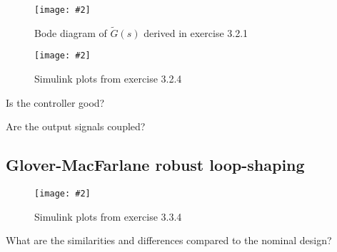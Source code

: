 \documentclass[a4paper,11pt]{article}
\newcommand{\image}[3][width=1.0\columnwidth]{
	\begin{figure}[h!]
		\centering
	    \texttt{[image: \#2]}
		\caption{#3}
		\label{fig:#2}
	\end{figure}
}
\begin{document}
	\image{figure_4.pdf}{Bode diagram of $\tilde{G}(s)$ derived in exercise 3.2.1}
	\image{figure_5.pdf}{Simulink plots from exercise 3.2.4}

	Is the controller good?
	\par\dotfill\par\dotfill\par
	Are the output signals coupled?
	\par\dotfill\par\dotfill

	\subsection*{Glover-MacFarlane robust loop-shaping}

	\image{figure_6.pdf}{Simulink plots from exercise 3.3.4}

	What are the similarities and differences compared to the nominal design?
	\par\dotfill\par\dotfill
\end{document}
